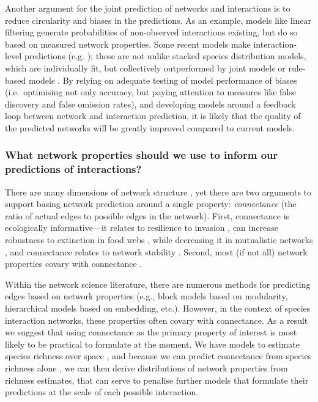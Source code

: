 Another argument for the joint prediction of networks and interactions
is to reduce circularity and biases in the predictions. As an example,
models like linear filtering \cite{Stock2017LinFil} generate
probabilities of non-observed interactions existing, but do so based on
measured network properties. Some recent models make interaction-level
predictions (e.g. \cite{Gravel2019BriElt}); these are not unlike stacked
species distribution models, which are individually fit, but
collectively outperformed by joint models or rule-based models
\cite{Zurell2020TesSpe}. By relying on adequate testing of model
performance of biases (i.e.~optimising not only accuracy, but paying
attention to measures like false discovery and false omission rates),
and developing models around a feedback loop between network and
interaction prediction, it is likely that the quality of the predicted
networks will be greatly improved compared to current models.

\subsubsection{What network properties should we use to inform our
predictions of
interactions?}\label{what-network-properties-should-we-use-to-inform-our-predictions-of-interactions}

There are many dimensions of network structure \cite{Delmas2018AnaEco},
yet there are two arguments to support basing network prediction around
a single property: \emph{connectance} (the ratio of actual edges to
possible edges in the network). First, connectance is ecologically
informative---it relates to resilience to invasion \cite{Baiser2010ConDet,
Smith-Ramesh2016GloSyn}, can increase robustness to extinction in
food webs \cite{Dunne2002NetStr}, while decreasing it in mutualistic
networks \cite{Vieira2015SimSto}, and connectance relates to network
stability \cite{Landi2018ComSta}. Second, most (if not all) network
properties covary with connectance \cite{Poisot2014WheEco,
Dunne2002FooStr}.

Within the network science literature, there are numerous methods for
predicting edges based on network properties (e.g., block models
\cite{Yen2020ComDet} based on modularity, hierarchical models
\cite{Kawakatsu2021EmeHie} based on embedding, etc.). However, in the
context of species interaction networks, these properties often covary
with connectance. As a result we suggest that using connectance as the
primary property of interest is most likely to be practical to formulate
at the moment. We have models to estimate species richness over space
\cite{Jenkins2013GloPat}, and because we can predict connectance from
species richness alone \cite{MacDonald2020RevLin}, we can then derive
distributions of network properties from richness estimates, that can
serve to penalise further models that formulate their predictions at the
scale of each possible interaction.

